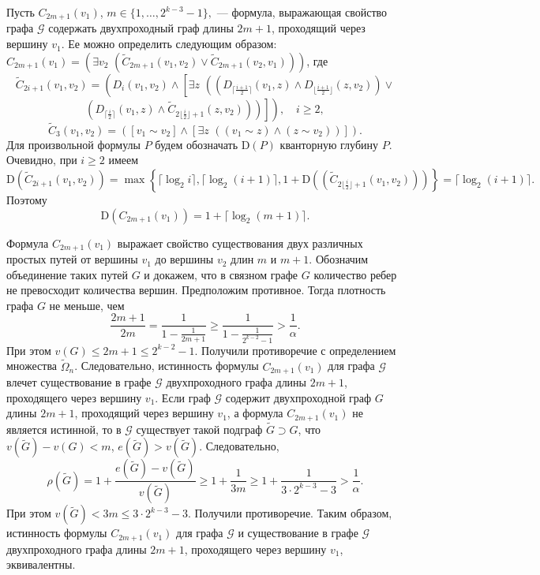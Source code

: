 \documentclass[12pt,a4paper,russian,titlepage]{article}
\begin{document}
Пусть $C_{2m+1}(v_1)$, $m\in \{1,\ldots,2^{k-3}-1\},$ --- формула, выражающая свойство графа $\mathcal{G}$ содержать двухпроходный граф длины $2m + 1$, проходящий через вершину $v_1$. Ее можно определить следующим образом: $C_{2m+1}(v_1)=(\exists v_2\,\,(\tilde C_{2m+1}(v_1,v_2)\vee \tilde C_{2m+1}(v_2,v_1)))$, где
$$
 \tilde C_{2i+1}(v_1,v_2)=
 \left(D_i(v_1,v_2)\wedge
 \left[\exists z\,\,\left(\left(D_{\lceil\frac{i+1}{2}\rceil}(v_1,z)\wedge D_{\lfloor\frac{i+1}{2}\rfloor}(z,v_2)\right)\vee\right.\right.\right.
$$
$$
 \left.\left.\left.\left(D_{\lceil\frac{i}{2}\rceil}(v_1,z)\wedge \tilde C_{2\lfloor\frac{i}{2}\rfloor+1}(z,v_2)\right)\right)\right]\right),\quad i\geq 2,
$$
$$
 \tilde C_3(v_1,v_2)=([v_1\sim v_2]\wedge[\exists z \,\,((v_1\sim z)\wedge(z\sim v_2))]).
$$
Для произвольной формулы $P$ будем обозначать $\mathrm{D}(P)$ кванторную глубину $P$. Очевидно, при $i\geq 2$ имеем
$$
 \mathrm{D}(\tilde C_{2i+1}(v_1,v_2))=\max\left\{\lceil\log_2 i\rceil,\lceil\log_2(i+1)\rceil,1+\mathrm{D}((\tilde  C_{2\lfloor\frac{i}{2}\rfloor+1}(v_1,v_2)))\right\}=
 \lceil\log_2(i+1)\rceil.
$$
Поэтому
\begin{equation}
\mathrm{D}(C_{2m+1}(v_1))=1+\lceil\log_2(m+1)\rceil.
\label{depth}
\end{equation}

Формула $C_{2m+1}(v_1)$ выражает свойство существования двух различных простых путей от вершины $v_1$ до вершины $v_2$ длин $m$ и $m+1$. Обозначим объединение таких путей $G$ и докажем, что в связном графе $G$ количество ребер не превосходит количества вершин. Предположим противное. Тогда плотность графа $G$ не меньше, чем
$$
 \frac{2m+1}{2m}=\frac{1}{1-\frac{1}{2m+1}}\geq\frac{1}{1-\frac{1}{2^{k-2}-1}}>\frac{1}{\alpha}.
$$
При этом $v(G)\leq 2m+1\leq 2^{k-2}-1$. Получили противоречие с определением множества $\tilde\Omega_n$. Следовательно, истинность формулы $C_{2m+1}(v_1)$ для графа $\mathcal{G}$ влечет существование в графе $\mathcal{G}$ двухпроходного графа длины $2m+1$, проходящего через вершину $v_1$. Если граф $\mathcal{G}$ содержит двухпроходной граф $G$ длины $2m+1$, проходящий через вершину $v_1$, а формула $C_{2m+1}(v_1)$ не является истинной, то в $\mathcal{G}$ существует такой подграф $\tilde G\supset G$, что $v(\tilde G)-v(G)<m$, $e(\tilde G)>v(\tilde G)$. Следовательно,
$$
 \rho(\tilde G) = 1 + \frac{e(\tilde G)-v(\tilde G)}{v(\tilde G)} \geq 1 + \frac{1}{3m}\geq 1 + \frac{1}{3\cdot 2^{k - 3} - 3} > \frac{1}{\alpha}.
$$
При этом $v(\tilde G)<3m\leq 3\cdot 2^{k-3}-3$. Получили противоречие. Таким образом, истинность формулы $C_{2m+1}(v_1)$ для графа $\mathcal{G}$ и существование в графе $\mathcal{G}$ двухпроходного графа длины $2m+1$, проходящего через вершину $v_1$, эквивалентны.
\end{document}
